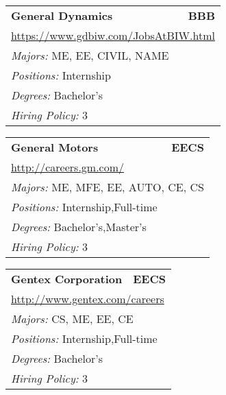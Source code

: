 \documentclass[twoside]{article}
\begin{document}
\begin{center}
\begin{multicols}{3}
\begin{FlushLeft}
\begin{minipage}{.9\columnwidth}
\end{minipage}
 
\begin{minipage}{.9\columnwidth}\begin{tabularx}{.95\columnwidth}{Xr}
                 {\Large\bf General Dynamics} & {\Large\bf BBB}\\
    \multicolumn{2}{p{.95\columnwidth}}{\url{https://www.gdbiw.com/JobsAtBIW.html}}\\
    \multicolumn{2}{p{.95\columnwidth}}{\emph{Majors:} ME, EE, CIVIL, NAME}\\
    \multicolumn{2}{p{.95\columnwidth}}{\emph{Positions:} Internship}\\
    \multicolumn{2}{p{.95\columnwidth}}{\emph{Degrees:} Bachelor's}\\
    \multicolumn{2}{p{.95\columnwidth}}{\emph{Hiring Policy:} 3}\\
    \end{tabularx}
    
\end{minipage}
 
\begin{minipage}{.9\columnwidth}\begin{tabularx}{.95\columnwidth}{Xr}
                 {\Large\bf General Motors} & {\Large\bf EECS}\\
    \multicolumn{2}{p{.95\columnwidth}}{\url{http://careers.gm.com/}}\\
    \multicolumn{2}{p{.95\columnwidth}}{\emph{Majors:} ME, MFE, EE, AUTO, CE, CS}\\
    \multicolumn{2}{p{.95\columnwidth}}{\emph{Positions:} Internship,Full-time}\\
    \multicolumn{2}{p{.95\columnwidth}}{\emph{Degrees:} Bachelor's,Master's}\\
    \multicolumn{2}{p{.95\columnwidth}}{\emph{Hiring Policy:} 3}\\
    \end{tabularx}
    
\end{minipage}
 
\begin{minipage}{.9\columnwidth}\begin{tabularx}{.95\columnwidth}{Xr}
                 {\Large\bf Gentex Corporation} & {\Large\bf EECS}\\
    \multicolumn{2}{p{.95\columnwidth}}{\url{http://www.gentex.com/careers}}\\
    \multicolumn{2}{p{.95\columnwidth}}{\emph{Majors:} CS, ME, EE, CE}\\
    \multicolumn{2}{p{.95\columnwidth}}{\emph{Positions:} Internship,Full-time}\\
    \multicolumn{2}{p{.95\columnwidth}}{\emph{Degrees:} Bachelor's}\\
    \multicolumn{2}{p{.95\columnwidth}}{\emph{Hiring Policy:} 3}\\
    \end{tabularx}
    

\end{minipage}
\end{FlushLeft}
\end{multicols}
\end{center}
\end{document}
